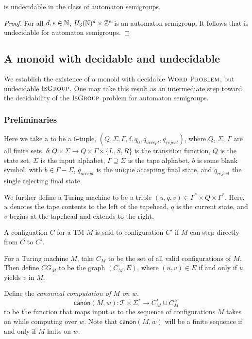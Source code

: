 \documentclass[11pt, titlepage]{article}
\begin{document}
\begin{theorem}
   is undecidable in the class of
  automaton semigroups.
\end{theorem}
\begin{proof}

For all $d, e \in \mathbb{N}$, $H_3(\mathbb{N})^d \times \mathbb{Z}^e$ is an automaton
semigroup. It follows that  is
undecidable for automaton semigroups.

\end{proof} %

\subsection{A monoid with decidable  and undecidable } 

We establish the existence of a monoid with decidable
$\textsc{Word Problem}$, but undecidable $\textsc{IsGroup}$. One may
take this result as an intermediate step toward the decidability of
the $\textsc{IsGroup}$ problem for automaton semigroups.

\subsubsection*{Preliminaries}
Here we take a  to be a 6-tuple,
$(Q, \Sigma, \Gamma, \delta, q_0, q_{accept}, q_{reject})$, where $Q$,
$\Sigma$, $\Gamma$ are all finite sets.
$\delta : Q \times \Sigma \rightarrow Q\times \Gamma \times \{L,S,R\}$
is the transition function, $Q$ is the state set, $\Sigma$ is the
input alphabet, $\Gamma \supseteq \Sigma$ is the tape alphabet, $b$ is
some blank symbol, with $b \in \Gamma - \Sigma$, $q_{accept}$ is the
unique accepting final state, and $q_{reject}$ the single rejecting
final state.

We further define a Turing machine  to be a triple
$(u, q, v) \in \Gamma^* \times Q \times \Gamma^*$. Here, $u$ denotes
the tape contents to the left of the tapehead, $q$ is the current
state, and $v$ begins at the tapehead and extends to the right.

A configuation $C$ for a TM $M$ is said to  configuration
$C'$ if $M$ can step directly from $C$ to $C'$.

For a Turing machine $M$, take $C_M$ to be the set of all valid
configurations of $M$. Then define $CG_M$ to be the graph $(C_M, E)$,
where $(u,v) \in E$ if and only if $u$ yields $v$ in $M$.
\begin{definition}
Define the \emph{canonical computation of $M$ on $w$}.
\[
  \textsf{canon}(M, w) : \mathcal{T} \times \Sigma^*
      \rightarrow
       C_M^*\cup C_M^\omega
\]
to be the function that maps input $w$ to the sequence of
configurations $M$ takes on while computing over $w$. Note that
$\textsf{canon}(M, w)$ will be a finite sequence if and only if $M$
halts on $w$.
\end{definition}
\end{document}
